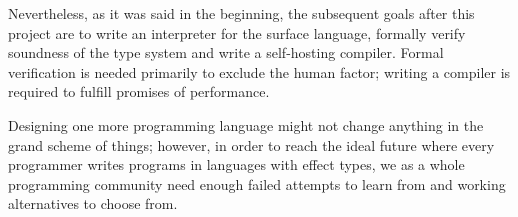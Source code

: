 \documentclass[a4paper,14pt]{extreport}
\begin{document}
Nevertheless, as it was said in the beginning, the subsequent goals after this
project are to write an interpreter for the surface language, formally verify
soundness of the type system and write a self-hosting compiler. Formal
verification is needed primarily to exclude the human factor; writing a compiler
is required to fulfill promises of performance.

Designing one more programming language might not change anything in the grand
scheme of things; however, in order to reach the ideal future where every
programmer writes programs in languages with effect types, we as a whole
programming community need enough failed attempts to learn from and working
alternatives to choose from.



\end{document}
